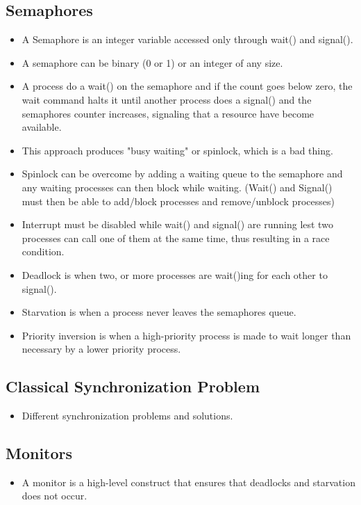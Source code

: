 \documentclass[a4wide,10pt]{article}
\begin{document}
\subsection{Semaphores} %
\label{sub:semaphores}
\begin{itemize}
	\item A Semaphore is an integer variable accessed only through wait() and signal().
	\item A semaphore can be binary (0 or 1) or an integer of any size.
	\item A process do a wait() on the semaphore and if the count goes below zero, the wait command halts it until another process does a signal() and the semaphores counter increases, signaling that a resource have become available.
	\item This approach produces "busy waiting" or spinlock, which is a bad thing.
	\item Spinlock can be overcome by adding a waiting queue to the semaphore and any waiting processes can then block while waiting. (Wait() and Signal() must then be able to add/block processes and remove/unblock processes)
	\item Interrupt must be disabled while wait() and signal() are running lest two processes can call one of them at the same time, thus resulting in a race condition.
	\item Deadlock is when two, or more processes are wait()ing for each other to signal().
	\item Starvation is when a process never leaves the semaphores queue.
	\item Priority inversion is when a high-priority process is made to wait longer than necessary by a lower priority process.
\end{itemize}

\subsection{Classical Synchronization Problem} %
\label{sub:classical_synchronization_problem}
\begin{itemize}
	\item Different synchronization problems and solutions.
\end{itemize}

\addtocounter{subsection}{1}
\subsection{Monitors} %
\label{sub:monitors}
\begin{itemize}
	\item A monitor is a high-level construct that ensures that deadlocks and starvation does not occur.
\end{itemize}
\end{document}
